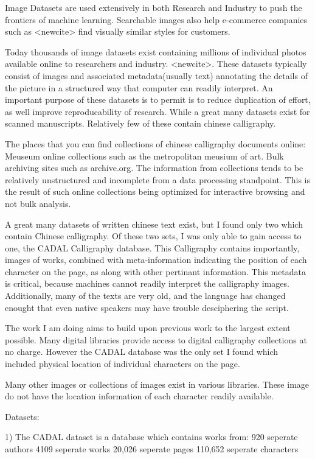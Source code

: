 Image Datasets are used extensively in both Research and Industry to push the frontiers of machine learning.  Searchable images also help e-commerce companies such as <newcite> find visually similar styles for customers.

Today thousands of image datasets exist containing millions of individual photos available online to researchers and industry.  <newcite>.  These datasets typically consist of images and associated metadata(usually text) annotating the details of the picture in a structured way that computer can readily interpret.  An important purpose of these datasets is to permit is to reduce duplication of effort, as well improve reproducability of research.  While a great many datasets exist for scanned manuscripts.  Relatively few of these contain chinese calligraphy.

The places that you can find collections of chinese calligraphy documents online:  Meuseum online collections such as the metropolitan meusium of art.  Bulk archiving sites such as archive.org.  The information from collections tends to be relatively unstructured and incomplete from a data processing standpoint.  This is the result of such online collections being optimized for interactive browsing and not bulk analysis.

A great many datasets of written chinese text exist, but I found only two which contain Chinese calligraphy.  Of these two sets, I was only able to gain access to one, the CADAL Calligraphy database.  This Calligraphy contains importantly, images of works, combined with meta-information indicating the position of each character on the page, as along with other pertinant information.  This metadata is critical, because machines cannot readily interpret the calligraphy images.  Additionally, many of the texts are very old, and the language has changed enought that even native speakers may have trouble desciphering the script.

The work I am doing aims to build upon previous work to the largest extent possible.  Many digital libraries provide access to digital calligraphy collections at no charge.  However the CADAL database was the only set I found which included physical location of individual characters on the page.

   Many other images or collections of images exist in various libraries.  These image do not have the location information of each character readily available.

Datasets:

1)  The CADAL dataset is a database which contains works from:
    920 seperate authors
    4109 seperate works
    20,026 seperate pages
    110,652 seperate characters


